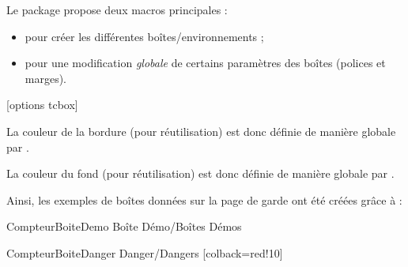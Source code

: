 \documentclass[french,11pt,a4paper]{article}
\begin{document}
Le package propose deux macros principales :

\begin{itemize}
	\item {} pour créer les différentes boîtes/environnements ;
	\item {} pour une modification \textit{globale} de certains paramètres des boîtes (polices et marges).
\end{itemize}

\medskip

\begin{codehigh}[language=latex/latex2,style/main=cyan!10,style/code=cyan!10]
[options tcbox]
\ParamBoites[Clés]
\end{codehigh}

\medskip

La couleur de la bordure (pour réutilisation) est donc définie de manière globale par .

La couleur du fond (pour réutilisation) est donc définie de manière globale par .

\medskip

Ainsi, les exemples de boîtes données sur la page de garde ont été créées grâce à :

\begin{codehigh}[language=latex/latex2,style/main=cyan!10,style/code=cyan!10]
    {CompteurBoiteDemo}            %
    {\faIcons}                     %
    {Boîte Démo/Boîtes Démos}      %

    {CompteurBoiteDanger}          %
    {}            %
    {Danger/Dangers}               %
    [colback=red!10]               %
\end{codehigh}

\begin{demohigh}[language=latex/latex2,style/main=cyan!10,style/code=cyan!10]
\setcounter{CompteurBoiteDemo}{0}
\setcounter{CompteurBoiteDanger}{0}
\begin{BoiteDeDemo}
    \lipsum[1][1]
\end{BoiteDeDemo}

\begin{BoiteDanger}
    \lipsum[2][1]
\end{BoiteDanger}
\end{demohigh}
\end{document}
